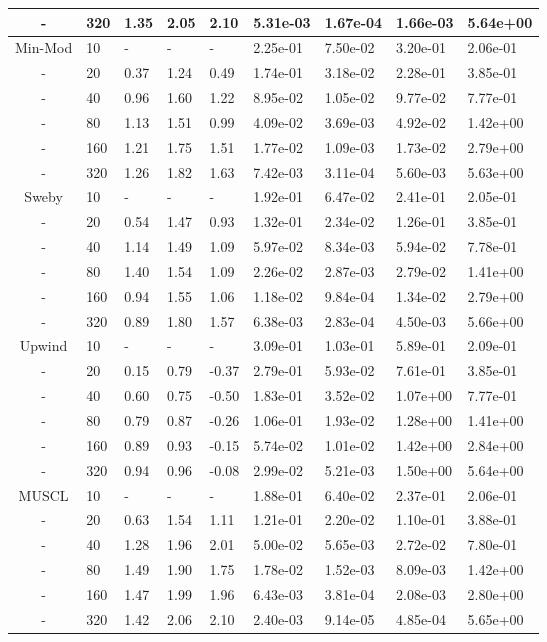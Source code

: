 \begin{table}[p]
{\begin{tabular}{cllllllll}
     - & 320 & 1.35 & 2.05 & 2.10 & 5.31e-03 & 1.67e-04 & 1.66e-03 & 5.64e+00 \\ 
   \hline
        Min-Mod &  10 & - & - & - & 2.25e-01 & 7.50e-02 & 3.20e-01 & 2.06e-01 \\ 
        - &  20 & 0.37 & 1.24 & 0.49 & 1.74e-01 & 3.18e-02 & 2.28e-01 & 3.85e-01 \\ 
        - &  40 & 0.96 & 1.60 & 1.22 & 8.95e-02 & 1.05e-02 & 9.77e-02 & 7.77e-01 \\ 
        - &  80 & 1.13 & 1.51 & 0.99 & 4.09e-02 & 3.69e-03 & 4.92e-02 & 1.42e+00 \\ 
        - & 160 & 1.21 & 1.75 & 1.51 & 1.77e-02 & 1.09e-03 & 1.73e-02 & 2.79e+00 \\ 
        - & 320 & 1.26 & 1.82 & 1.63 & 7.42e-03 & 3.11e-04 & 5.60e-03 & 5.63e+00 \\ 
   \hline
          Sweby &  10 & - & - & - & 1.92e-01 & 6.47e-02 & 2.41e-01 & 2.05e-01 \\ 
          - &  20 & 0.54 & 1.47 & 0.93 & 1.32e-01 & 2.34e-02 & 1.26e-01 & 3.85e-01 \\ 
          - &  40 & 1.14 & 1.49 & 1.09 & 5.97e-02 & 8.34e-03 & 5.94e-02 & 7.78e-01 \\ 
          - &  80 & 1.40 & 1.54 & 1.09 & 2.26e-02 & 2.87e-03 & 2.79e-02 & 1.41e+00 \\ 
          - & 160 & 0.94 & 1.55 & 1.06 & 1.18e-02 & 9.84e-04 & 1.34e-02 & 2.79e+00 \\ 
          - & 320 & 0.89 & 1.80 & 1.57 & 6.38e-03 & 2.83e-04 & 4.50e-03 & 5.66e+00 \\ 
   \hline
         Upwind &  10 & - & - & - & 3.09e-01 & 1.03e-01 & 5.89e-01 & 2.09e-01 \\ 
         - &  20 & 0.15 & 0.79 & -0.37& 2.79e-01 & 5.93e-02 & 7.61e-01 & 3.85e-01 \\ 
         - &  40 & 0.60 & 0.75 & -0.50& 1.83e-01 & 3.52e-02 & 1.07e+00 & 7.77e-01 \\ 
         - &  80 & 0.79 & 0.87 & -0.26& 1.06e-01 & 1.93e-02 & 1.28e+00 & 1.41e+00 \\ 
         - & 160 & 0.89 & 0.93 & -0.15& 5.74e-02 & 1.01e-02 & 1.42e+00 & 2.84e+00 \\ 
         - & 320 & 0.94 & 0.96 & -0.08& 2.99e-02 & 5.21e-03 & 1.50e+00 & 5.64e+00 \\ 
   \hline
          MUSCL &  10 & - & - & - & 1.88e-01 & 6.40e-02 & 2.37e-01 & 2.06e-01 \\ 
          - &  20 & 0.63 & 1.54 & 1.11 & 1.21e-01 & 2.20e-02 & 1.10e-01 & 3.88e-01 \\ 
          - &  40 & 1.28 & 1.96 & 2.01 & 5.00e-02 & 5.65e-03 & 2.72e-02 & 7.80e-01 \\ 
          - &  80 & 1.49 & 1.90 & 1.75 & 1.78e-02 & 1.52e-03 & 8.09e-03 & 1.42e+00 \\ 
          - & 160 & 1.47 & 1.99 & 1.96 & 6.43e-03 & 3.81e-04 & 2.08e-03 & 2.80e+00 \\ 
          - & 320 & 1.42 & 2.06 & 2.10 & 2.40e-03 & 9.14e-05 & 4.85e-04 & 5.65e+00 \\ 
   \hline
   \end{tabular}
   }
\end{table}

